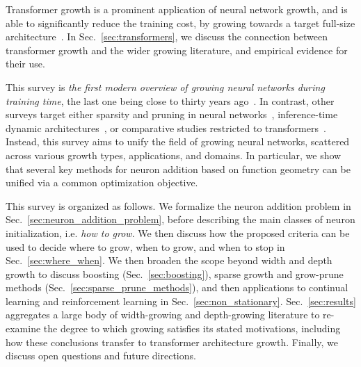 Transformer growth is a prominent application of neural network growth, and is able to significantly reduce the training cost, by growing towards a target full-size architecture~\cite{gu_bert_2021,wang_ligo_2023}. In Sec.~\ref{sec:transformers}, we discuss the connection between transformer growth and the wider growing literature, and empirical evidence for their use.

This survey is \emph{the first modern overview of growing neural networks during training time}, the last one being close to thirty years ago~\citep{kwok_constructive_1997}. In contrast, other surveys target either sparsity and pruning in neural networks~\citep{sparsitySurvey}, inference-time dynamic architectures~\citep{dynamicSurvey}, or comparative studies restricted to transformers~\citep{pandey2024comparative}. Instead, this survey aims to unify the field of growing neural networks, scattered across various growth types, applications, and domains. In particular, we show that several key methods for neuron addition based on function geometry can be unified via a common optimization objective.

This survey is organized as follows. We formalize the neuron addition problem in Sec.~\ref{sec:neuron_addition_problem}, before describing the main classes of neuron initialization, i.e. \emph{how to grow}. We then discuss how the proposed criteria can be used to decide where to grow, when to grow, and when to stop in Sec.~\ref{sec:where_when}. We then broaden the scope beyond width and depth growth to discuss boosting (Sec.~\ref{sec:boosting}), sparse growth and grow-prune methods (Sec.~\ref{sec:sparse_prune_methods}), and then applications to continual learning and reinforcement learning in Sec.~\ref{sec:non_stationary}. Sec.~\ref{sec:results} aggregates a large body of width-growing and depth-growing literature to re-examine the degree to which growing satisfies its stated motivations, including how these conclusions transfer to transformer architecture growth. Finally, we discuss open questions and future directions.
